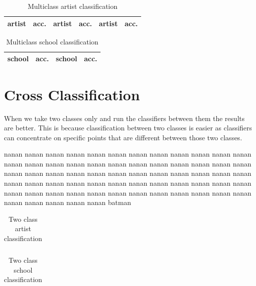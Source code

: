 \documentclass[11pt,a4paper,draft]{report}
\begin{document}
\begin{multicols}{2}
\begin{table}[ptb]
\centering
{}
\begin{tabular}{|l|r||l|r||l|r|}
\toprule
artist & acc. & artist & acc. & artist & acc. \\
\midrule

\bottomrule
\end{tabular}
\caption[Multiclass artist classification]{Multiclass artist classification}
\label{tab:predart}
\end{table}

\begin{table}[ptb]
\centering
\begin{tabular}{|l|r||l|r|}
\toprule
school & acc. & school & acc. \\
\midrule

\bottomrule
\end{tabular}
\caption[Multiclass school classification]{Multiclass school classification}
\label{tab:predsch}
\end{table}

\section{Cross Classification}

When we take two classes only and run the classifiers between them the results
are better.  This is because classification between two classes is easier as
classifiers can concentrate on specific points that are different between those
two classes.

nanan nanan nanan nanan nanan nanan nanan nanan nanan nanan nanan nanan nanan
nanan nanan nanan nanan nanan nanan nanan nanan nanan nanan nanan nanan nanan
nanan nanan nanan nanan nanan nanan nanan nanan nanan nanan nanan nanan nanan
nanan nanan nanan nanan nanan nanan nanan nanan nanan nanan nanan nanan nanan
nanan nanan nanan nanan nanan nanan nanan nanan nanan nanan nanan nanan nanan
batman

\begin{table}[ptb]
\centering
\begin{tabular}{r||r|r|r|r|r}
\toprule

\bottomrule
\end{tabular}
\caption[Two class artist classification]{Two class artist classification}
\label{tab:foldart}
\end{table}

\begin{table}[ptb]
\centering
{}
\begin{tabular}{r||r|r|r|r|r}
\toprule

\bottomrule
\end{tabular}
\caption[Two class school classification]{Two class school classification}
\label{tab:foldsch}
\end{table}


\end{multicols}
\end{document}
